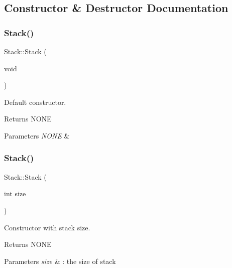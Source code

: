 \subsection{Constructor \& Destructor Documentation}
\mbox{\label{classStack_aa6e4e33ccce6c9a8df6e5519418bbd45}} 
\subsubsection{\texorpdfstring{Stack()}{Stack()}\hspace{0.1cm}{\footnotesize\ttfamily [1/2]}}
{\footnotesize\ttfamily Stack\+::\+Stack (\begin{DoxyParamCaption}\item[{void}]{ }\end{DoxyParamCaption})}



Default constructor. 

\begin{DoxyReturn}{Returns}
N\+O\+NE
\end{DoxyReturn}

\begin{DoxyParams}{Parameters}
{\em N\+O\+NE} & \\
\hline
\end{DoxyParams}
\mbox{\label{classStack_a8dc60fa32e08d0b556bf66f52e0b8af8}} 
\subsubsection{\texorpdfstring{Stack()}{Stack()}\hspace{0.1cm}{\footnotesize\ttfamily [2/2]}}
{\footnotesize\ttfamily Stack\+::\+Stack (\begin{DoxyParamCaption}\item[{int}]{size }\end{DoxyParamCaption})}



Constructor with stack size. 

\begin{DoxyReturn}{Returns}
N\+O\+NE
\end{DoxyReturn}

\begin{DoxyParams}{Parameters}
{\em size} & \+: the size of stack \\
\hline
\end{DoxyParams}
\mbox{\label{classStack_a40bd5dff912f0e5290777c4b46d17809}} 
